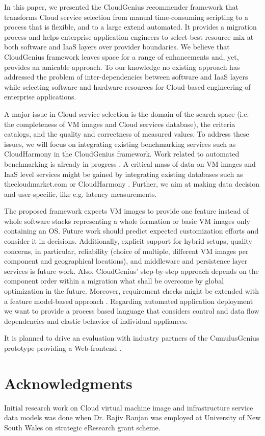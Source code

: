 \documentclass[10pt]{article}
\begin{document}
In this paper, we presented the CloudGenius recommender framework that transforms Cloud service selection from manual time-consuming scripting to a process that is flexible, and to a large extend automated. It provides a migration process and helps enterprise application engineers to select best resource mix at both software and IaaS layers over provider boundaries. We believe that CloudGenius framework leaves space for a range of enhancements and, yet, provides an amicable approach. To our knowledge no existing approach has addressed the problem of inter-dependencies between software and IaaS layers while selecting software and hardware resources for Cloud-based engineering of enterprise applications.  

A major issue in Cloud service selection is the domain of the search space (i.e. the completeness of VM images and Cloud services database), the criteria catalogs, and the quality and correctness of measured values. To address these issues, we will focus on integrating existing benchmarking services such as CloudHarmony \cite{cloudharmony2011} in the CloudGenius framework. Work related to automated benchmarking is already in progress \cite{haak2011autonomic}. A critical mass of data on VM images and IaaS level services might be gained by integrating existing databases such as thecloudmarket.com \cite{cloudmarket2011} or CloudHarmony \cite{cloudharmony2011}. Further, we aim at making data decision and user-specific, like e.g. latency measurements. 

The proposed framework expects VM images to provide one feature instead of whole software stacks representing a whole formation or basic VM images only containing an OS. Future work should predict expected customization efforts and consider it in decisions. Additionally, explicit support for hybrid setups, quality concerns, in particular, reliability (choice of multiple, different VM images per component and geographical locations), and middleware and persistence layer services is future work. Also, CloudGenius' step-by-step approach depends on the component order within a migration what shall be overcome by global optimization in the future.  Moreover, requirement checks might be extended with a feature model-based approach \cite{wittern2011use}. Regarding automated application deployment we want to provide a process based language that considers control and data flow dependencies and elastic behavior of individual appliances.

It is planned to drive an evaluation with industry partners of the CumulusGenius prototype providing a Web-frontend \cite{cumulusgeniusonline2011}.









\section{Acknowledgments}
Initial research work on Cloud virtual machine image and infrastructure service data models was done when Dr. Rajiv Ranjan was employed at University of New South Wales on strategic eResearch grant scheme. 





\end{document}

